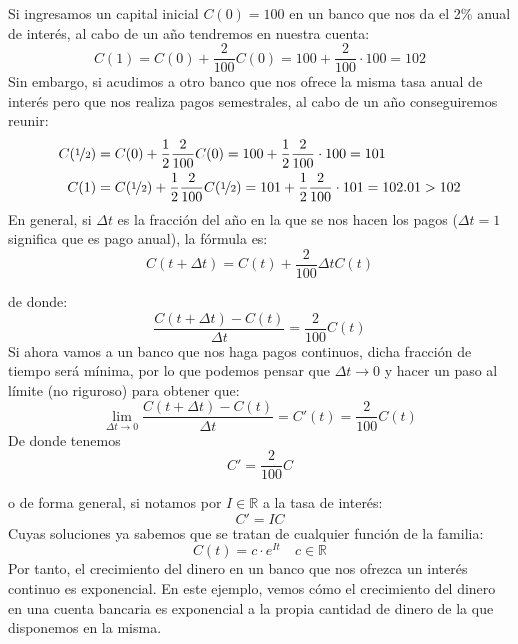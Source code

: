 \begin{ejemplo}
    Si ingresamos un capital inicial $C(0) = 100$ en un banco que nos da el 2\% anual de interés, al cabo de un año tendremos en nuestra cuenta:
    \begin{equation*}
        C(1) = C(0) + \dfrac{2}{100}C(0) = 100 + \dfrac{2}{100}\cdot 100 = 102
    \end{equation*}
Sin embargo, si acudimos a otro banco que nos ofrece la misma tasa anual de interés pero que nos realiza pagos semestrales, al cabo de un año conseguiremos reunir:
\begin{align*}
    C(\nicefrac{1}{2}) &= C(0) + \dfrac{1}{2}\dfrac{2}{100}C(0) = 100 + \dfrac{1}{2}\dfrac{2}{100}\cdot 100 = 101 \\
    C(1) &= C(\nicefrac{1}{2}) + \dfrac{1}{2}\dfrac{2}{100}C(\nicefrac{1}{2}) = 101 + \dfrac{1}{2}\dfrac{2}{100}\cdot 101 = 102.01 > 102
\end{align*}
En general, si $\Delta t$ es la fracción del año en la que se nos hacen los pagos ($\Delta t = 1$ significa que es pago anual), la fórmula es:
\begin{equation*}
    C(t+\Delta t) = C(t) + \dfrac{2}{100}\Delta t C(t)
\end{equation*}

de donde:
\begin{equation*}
    \dfrac{C(t+\Delta t) - C(t)}{\Delta t} = \dfrac{2}{100} C(t)
\end{equation*}
Si ahora vamos a un banco que nos haga pagos continuos, dicha fracción de tiempo será mínima, por lo que podemos pensar que $\Delta t \rightarrow 0$ y hacer un paso al límite (no riguroso) para obtener que:
\begin{equation*}
    \lim_{\Delta t\to0} \dfrac{C(t+\Delta t) - C(t)}{\Delta t} = C'(t) = \dfrac{2}{100}C(t)
\end{equation*}
De donde tenemos
\begin{equation*}
    C' = \dfrac{2}{100} C
\end{equation*}

o de forma general, si notamos por $I\in \mathbb{R}$ a la tasa de interés:
\begin{equation*}
    C' = I C
\end{equation*}
Cuyas soluciones ya sabemos que se tratan de cualquier función de la familia:
\begin{equation*}
    C(t) = c \cdot e^{It} \quad c\in \mathbb{R}
\end{equation*}
Por tanto, el crecimiento del dinero en un banco que nos ofrezca un interés continuo es exponencial. En este ejemplo, vemos cómo el crecimiento del dinero en una cuenta bancaria es exponencial a la propia cantidad de dinero de la que disponemos en la misma.
\end{ejemplo}

